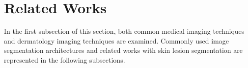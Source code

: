 \chapter{Related Works}

    In the first subsection of this section, both common medical imaging techniques and dermatology imaging techniques are examined.
    Commonly used image segmentation architectures and related works with skin lesion segmentation are represented in the following subsections.

    

    

    
